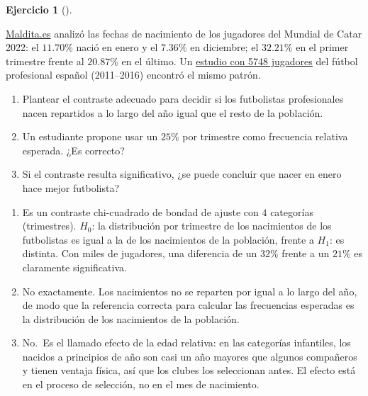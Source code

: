 \documentclass[
  spanish,
  a4paper,
]{scrreport}
\theoremstyle{definition}
\newtheorem{exercise}{Ejercicio}[chapter]
\theoremstyle{remark}
\begin{document}
\begin{exercise}[]\protect\hypertarget{exr-interpretacion-futbolistas-enero}{}\label{exr-interpretacion-futbolistas-enero}

\href{https://maldita.es/malditodato/20221130/mundial-catar-edad-relativa-enero-futbolistas/}{Maldita.es}
analizó las fechas de nacimiento de los jugadores del Mundial de Catar
2022: el \(11.70\)\% nació en enero y el \(7.36\)\% en diciembre; el
\(32.21\)\% en el primer trimestre frente al \(20.87\)\% en el último.
Un
\href{https://portalcientifico.unileon.es/documentos/5f94cd182999521ddf0ba2c0?lang=es}{estudio
con 5748 jugadores} del fútbol profesional español (2011--2016) encontró
el mismo patrón.

\begin{enumerate}
\def\labelenumi{\alph{enumi}.}
\item
  Plantear el contraste adecuado para decidir si los futbolistas
  profesionales nacen repartidos a lo largo del año igual que el resto
  de la población.
\item
  Un estudiante propone usar un \(25\)\% por trimestre como frecuencia
  relativa esperada. ¿Es correcto?
\item
  Si el contraste resulta significativo, ¿se puede concluir que nacer en
  enero hace mejor futbolista?
\end{enumerate}

\end{exercise}

\begin{tcolorbox}[enhanced jigsaw, arc=.35mm, bottomrule=.15mm, bottomtitle=1mm, breakable, colback=white, colbacktitle=quarto-callout-tip-color!10!white, colframe=quarto-callout-tip-color-frame, coltitle=black, left=2mm, leftrule=.75mm, opacityback=0, opacitybacktitle=0.6, rightrule=.15mm, title=\textcolor{quarto-callout-tip-color}{\faLightbulb}\hspace{0.5em}{Solución}, titlerule=0mm, toprule=.15mm, toptitle=1mm]

\begin{enumerate}
\def\labelenumi{\alph{enumi}.}
\item
  Es un contraste chi-cuadrado de bondad de ajuste con \(4\) categorías
  (trimestres). \(H_0\): la distribución por trimestre de los
  nacimientos de los futbolistas es igual a la de los nacimientos de la
  población, frente a \(H_1\): es distinta. Con miles de jugadores, una
  diferencia de un \(32\)\% frente a un \(21\)\% es claramente
  significativa.
\item
  No exactamente. Los nacimientos no se reparten por igual a lo largo
  del año, de modo que la referencia correcta para calcular las
  frecuencias esperadas es la distribución de los nacimientos de la
  población.
\item
  No.~Es el llamado efecto de la edad relativa: en las categorías
  infantiles, los nacidos a principios de año son casi un año mayores
  que algunos compañeros y tienen ventaja física, así que los clubes los
  seleccionan antes. El efecto está en el proceso de selección, no en el
  mes de nacimiento.
\end{enumerate}

\end{tcolorbox}
\end{document}
